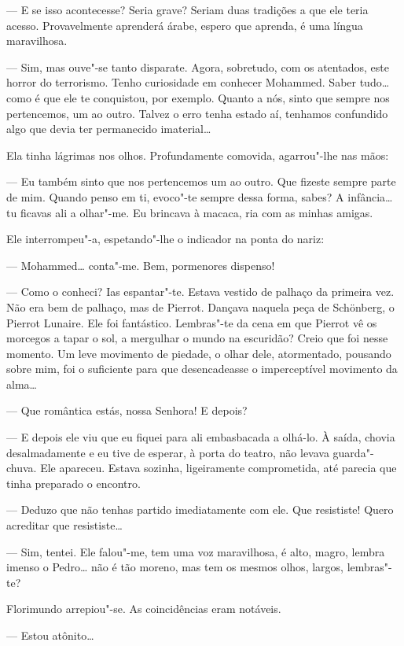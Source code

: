 --- E se isso acontecesse? Seria grave? Seriam duas tradições a que ele
teria acesso. Provavelmente aprenderá árabe, espero que aprenda, é uma
língua maravilhosa.

--- Sim, mas ouve"-se tanto disparate. Agora, sobretudo, com os atentados,
este horror do terrorismo. Tenho curiosidade em conhecer Mohammed. Saber
tudo\ldots{} como é que ele te conquistou, por exemplo. Quanto a nós, sinto
que sempre nos pertencemos, um ao outro. Talvez o erro tenha estado aí,
tenhamos confundido algo que devia ter permanecido imaterial\ldots{}

Ela tinha lágrimas nos olhos. Profundamente comovida, agarrou"-lhe nas
mãos:

--- Eu também sinto que nos pertencemos um ao outro. Que fizeste sempre
parte de mim. Quando penso em ti, evoco"-te sempre dessa forma, sabes? A
infância\ldots{} tu ficavas ali a olhar"-me. Eu brincava à macaca, ria com as
minhas amigas.

Ele interrompeu"-a, espetando"-lhe o indicador na ponta do nariz:

--- Mohammed\ldots{} conta"-me. Bem, pormenores dispenso!

--- Como o conheci? Ias espantar"-te. Estava vestido de palhaço da primeira
vez. Não era bem de palhaço, mas de Pierrot. Dançava naquela peça de
Schönberg, o Pierrot Lunaire. Ele foi fantástico. Lembras"-te da cena em
que Pierrot vê os morcegos a tapar o sol, a mergulhar o mundo na
escuridão? Creio que foi nesse momento. Um leve movimento de piedade, o
olhar dele, atormentado, pousando sobre mim, foi o suficiente para que
desencadeasse o imperceptível movimento da alma\ldots{}

--- Que romântica estás, nossa Senhora! E depois?

--- E depois ele viu que eu fiquei para ali embasbacada a olhá-lo. À
saída, chovia desalmadamente e eu tive de esperar, à porta do teatro,
não levava guarda"-chuva. Ele apareceu. Estava sozinha, ligeiramente
comprometida, até parecia que tinha preparado o encontro.

--- Deduzo que não tenhas partido imediatamente com ele. Que resististe!
Quero acreditar que resististe\ldots{}

--- Sim, tentei. Ele falou"-me, tem uma voz maravilhosa, é alto, magro,
lembra imenso o Pedro\ldots{} não é tão moreno, mas tem os mesmos olhos,
largos, lembras"-te?

Florimundo arrepiou"-se. As coincidências eram notáveis.

--- Estou atônito\ldots{}

